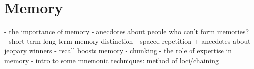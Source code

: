 \chapter{Memory}

- the importance of memory
- anecdotes about people who can't form memories? 
- short term long term memory distinction
- spaced repetition + anecdotes about jeopary winners
- recall boosts memory
- chunking
- the role of expertise in memory
- intro to some mnemonic techniques: method of loci/chaining
